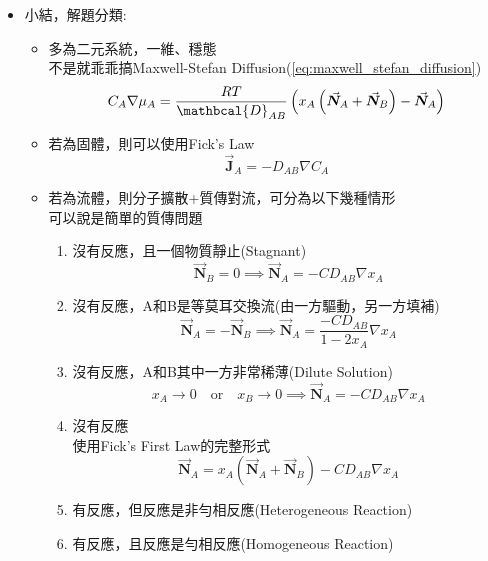 \documentclass[../main.tex]{subfiles}
\begin{document}
\begin{itemize}
\begin{itemize}
      質傳會用Sherwood Number或Stanton Number (Mass)來求出$k_c,k_y,k_p$
  \end{itemize}
\item 小結，解題分類:
\begin{itemize}
  \item 多為二元系統，一維、穩態\\
  不是就乖乖搞Maxwell-Stefan Diffusion(\ref{eq:maxwell_stefan_diffusion})
  \begin{equation}
    C_A \nabla \mu_A = \frac{RT}{\mathbcal{D}_{AB}} \left(
      x_A \left(\vec{\bm N}_A + \vec{\bm N}_B\right) - \vec{\bm N}_A
    \right)
  \end{equation}
  \item 若為固體，則可以使用Fick's Law
  \begin{equation}
    \vec{\bm J}_A = - D_{AB} \nabla C_A
  \end{equation}
  \item 若為流體，則分子擴散+質傳對流，可分為以下幾種情形\\
  可以說是簡單的質傳問題
  \begin{enumerate}
    \item 沒有反應，且一個物質靜止(Stagnant)
    \begin{equation}
      \vec{\bm N}_B = 0 \implies \vec{\bm N}_A = - C D_{AB} \nabla x_A
    \end{equation}
    \item 沒有反應，A和B是等莫耳交換流(由一方驅動，另一方填補)
    \begin{equation}
      \vec{\bm N}_A = -\vec{\bm N}_B \implies \vec{\bm N}_A = \frac{-C D_{AB}}{1-2x_A} \nabla x_A
    \end{equation}
    \item 沒有反應，A和B其中一方非常稀薄(Dilute Solution)
    \begin{equation}
      x_A \to 0 \quad \text{or}\quad x_B \to 0 \implies \vec{\bm N}_A = - C D_{AB} \nabla x_A
    \end{equation}
    \item 沒有反應\\
    使用Fick's First Law的完整形式
    \begin{equation}
      \vec{\bm N}_A = x_A \left(\vec{\bm N}_A + \vec{\bm N}_B\right) - C D_{AB} \nabla x_A
    \end{equation}
    \item 有反應，但反應是非勻相反應(Heterogeneous Reaction)
    \item 有反應，且反應是勻相反應(Homogeneous Reaction)

\end{enumerate}
\end{itemize}
\end{itemize}
\end{document}

